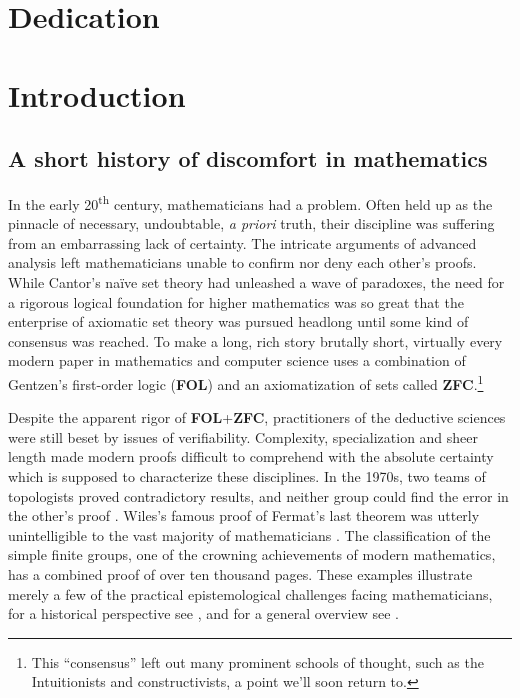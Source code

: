 \documentclass[12pt,twoside,draft]{reedthesis}
\makeatletter
\let\oldindex\index
\renewcommand{\index}[1]{\oldindex{#1}\marginpar{\footnotesize\color{index}index: #1}}
\newcommand{\indeX}[1]{\oldindex{#1}}
\newcommand{\abbreviation}[1]{\textbf{#1}\indeX{#1@\textbf{#1}}} %
\makeatother
\begin{document}
\chapter*{Dedication}

\mainmatter %
\pagestyle{fancyplain} %

\chapter*{Introduction}

\section*{A short history of discomfort in mathematics}


In the early 20\textsuperscript{th} century, mathematicians had a problem. Often
held up as the pinnacle of necessary, undoubtable, \textit{a priori} truth,
their discipline was suffering from an embarrassing lack of certainty. The
intricate arguments of advanced analysis left mathematicians unable to confirm
nor deny each other's proofs. While Cantor's na\"ive set theory had unleashed a
wave of paradoxes, the need for a rigorous logical foundation for higher
mathematics was so great that the enterprise of axiomatic set theory was pursued
headlong until some kind of consensus was reached. To make a long, rich story
brutally short, virtually every modern paper in mathematics and computer
science uses a combination of Gentzen's first-order logic (\abbreviation{FOL})
and an axiomatization of sets called
\abbreviation{ZFC}.\footnote{This ``consensus'' left out many
  prominent schools of thought, such as the Intuitionists and constructivists, a
  point we'll soon return to.} 

Despite the apparent rigor of \abbreviation{FOL}+\abbreviation{ZFC},
practitioners of the deductive sciences were still beset by issues of
verifiability. Complexity, specialization and sheer length made modern proofs
difficult to comprehend with the absolute certainty which is supposed to
characterize these disciplines. In the 1970s, two teams of topologists proved
contradictory results, and neither group could find the error in the other's
proof \cite{kolata}. Wiles's famous proof of Fermat's last theorem was utterly
unintelligible to the vast majority of mathematicians \cite{nyt}. The
classification of the simple finite groups, one of the crowning achievements of
modern mathematics, has a combined proof of over ten thousand pages. These
examples illustrate merely a few of the practical epistemological challenges
facing mathematicians, for a historical perspective see \cite{rigor-and-proof},
and for a general overview see \cite{fidelity}.
\end{document}
